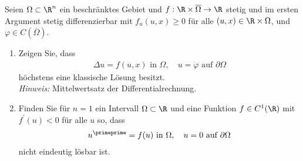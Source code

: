 
\begin{exercise}

Seien $\Omega \subset \R^n$ ein beschränktes Gebiet und $f:\R\times\overline{\Omega}\to\R$
stetig und im ersten Argument stetig differenzierbar mit $f_u(u,x) \geq 0$ für alle
$(u,x) \in \R \times \Omega$, und $\varphi \in C(\overline{\Omega})$.
\begin{enumerate}[label = (\alph*)]
  \item Zeigen Sie, dass
  \begin{align*}
    \Delta u = f(u,x) \text{ in } \Omega, \quad u = \varphi \text{ auf } \partial\Omega
  \end{align*}
  höchstens eine klassische Lösung besitzt. \\
  \textit{Hinweis:} Mittelwertsatz der Differentialrechnung.
  \item Finden Sie für $n = 1$ ein Intervall $\Omega \subset \R$ und eine Funktion
  $f \in C^1(\R)$ mit $f^{\prime}(u) < 0$ für alle $u$ so, dass
  \begin{align*}
    u^{\primeprime} = f(u) \text{ in } \Omega, \quad u = 0 \text{ auf } \partial\Omega
  \end{align*}
  nicht eindeutig lösbar ist.
\end{enumerate}

\end{exercise}


\begin{solution}

\phantom{}

\end{solution}

